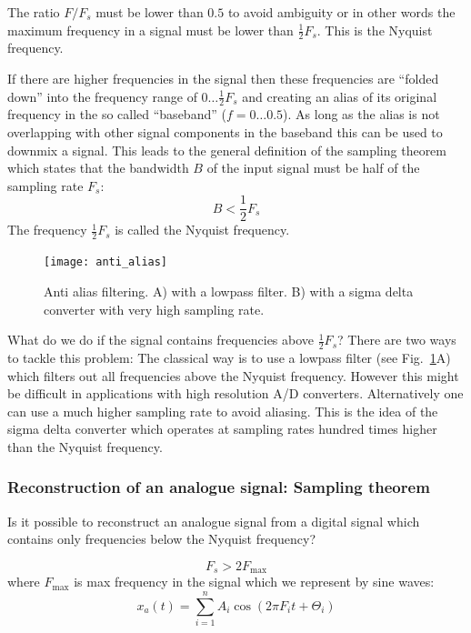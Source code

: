 \documentclass[12pt,a4paper]{article}
\begin{document}
The ratio $F/F_s$ must  be lower than $0.5$ to avoid ambiguity
or in other words the maximum frequency in a signal must be lower than 
$\frac{1}{2} F_s$. This is the Nyquist frequency.

If there are higher frequencies in the signal then these frequencies
are ``folded down'' into the frequency range of $0\ldots \frac{1}{2} F_s$
and creating an alias of its original frequency in the so called
``baseband'' ($f=0\ldots 0.5$). As long as the alias is not overlapping
with other signal components in the baseband this can be used to
downmix a signal. This leads to the general definition of the
sampling theorem which states that the bandwidth $B$ of the input signal
must be half of the sampling rate $F_s$:
\begin{equation}
B < \frac{1}{2}F_s
\label{samplingTheorem}
\end{equation}
The frequency $\frac{1}{2}F_s$ is called the Nyquist frequency.

\begin{figure}[!hbt]
\begin{center}
\mbox{\texttt{[image: anti\_alias]}}
\end{center}
\caption{Anti alias filtering. A) with a lowpass filter. B)
with a sigma delta converter with very high sampling rate.
\label{anti_alias}}
\end{figure}

What do we do if the signal contains frequencies above 
$\frac{1}{2} F_s$? There are two ways to tackle this problem:
The classical way is
to use a lowpass filter (see Fig.~\ref{anti_alias}A) which filters
out all frequencies above the Nyquist frequency. However this
might be difficult in applications with high resolution A/D converters.
Alternatively one can use a much higher sampling rate to avoid
aliasing. This is the idea of the sigma delta converter
which operates at sampling rates hundred times higher than the
Nyquist frequency.


\subsubsection{Reconstruction of an analogue signal: Sampling theorem}
Is it possible to reconstruct an analogue signal from a digital signal
which contains only frequencies below the Nyquist frequency?

\begin{equation}
F_s > 2 F_{\mbox{max}}
\end{equation}
where $F_{\mbox{max}}$ is max frequency in the signal which we
represent by sine waves:
\begin{equation}
x_{a}(t) = \sum_{i=1}^{n} A_i \cos (2 \pi F_{i}t  + \Theta_{i})
\end{equation}
\end{document}
